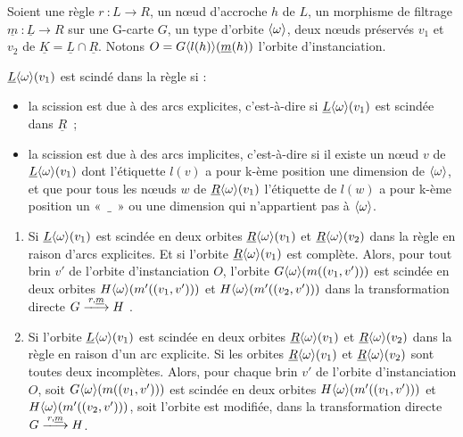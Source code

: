 \begin{proposition}\label{prop:formalisation-evenements-regles-jerboa-scission}
	Soient une règle $r~: L \longrightarrow R$, un n\oe ud d'accroche $h$ de $L$, un morphisme de
	filtrage $\underline{m}~: \underline{L} \rightarrow R$ sur une G-carte $G$, un type d'orbite
	$\langle\omega\rangle$, deux n\oe uds préservés $v_1$ et $v_2$ de $\underline{K} = \underline{L} \cap \underline{R}$. Notons $O = G\langle l(h)\rangle(\underline{m}(h))$ l'orbite d'instanciation.

	$\underline{L}\langle\omega\rangle(v_1)$ est scindé dans la règle si :
	\begin{itemize}
		\item la scission est due à des arcs explicites, c'est-à-dire si $\underline{L}\langle\omega\rangle(v_1)$ est scindée dans $\underline{R}$~;

		\item la scission est due à des arcs implicites, c'est-à-dire si il existe un n\oe ud $v$ de $\underline{L}\langle\omega\rangle(v_1)$ dont l'étiquette $l(v)$ a pour k-ème position une dimension de $\langle\omega\rangle$, et que pour tous les n\oe uds $w$ de $\underline{R}\langle\omega\rangle(v_1)$ l'étiquette de $l(w)$ a pour k-ème position un «~$\_$~» ou une dimension qui n'appartient pas à $\langle\omega\rangle$.
	\end{itemize}

	\begin{enumerate}

		\item
		      Si $\underline{L}\langle\omega\rangle(v_1)$ est scindée en deux orbites $\underline{R}\langle\omega\rangle(v_1)$ et $\underline{R}\langle\omega\rangle(v_2)$ dans la règle en raison d'arcs explicites.
		      Et si l'orbite $\underline{R}\langle\omega\rangle(v_1)$ est complète. %
		      Alors, pour tout brin $v'$ de l'orbite d'instanciation $O$, l'orbite $G\langle\omega\rangle(m((v_1,v')))$ est scindée en deux orbites $H\langle\omega\rangle(m'((v_1, v')))$ et $H\langle\omega\rangle(m'((v_2, v')))$ dans la transformation directe $G \xlongrightarrow{r,\underline{m}} H$ .

		\item Si l'orbite $\underline{L}\langle\omega\rangle(v_1)$ est scindée en deux orbites $\underline{R}\langle\omega\rangle(v_1)$ et
		      $\underline{R}\langle\omega\rangle(v_2)$ dans la règle en raison d'un arc explicite.
		      Si les orbites $\underline{R}\langle\omega\rangle(v_1)$ et $\underline{R}\langle\omega\rangle(v_2)$
		      sont toutes deux incomplètes.
		      Alors, pour chaque brin $v'$ de l'orbite d'instanciation $O$, soit $G\langle\omega\rangle(m((v_1,v')))$ est scindée en deux orbites
		      $H\langle\omega\rangle(m'((v_1, v')))$ et $H\langle\omega\rangle(m'((v_2,v')))$, soit l'orbite est modifiée, dans la transformation directe
		      $G \xlongrightarrow{r, \underline{m}} H$.


\end{enumerate}
\end{proposition}
